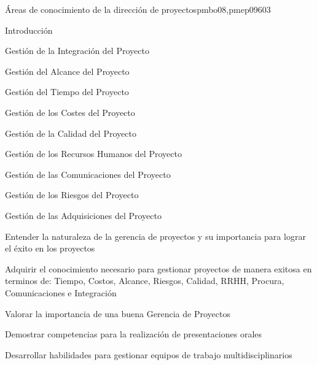 \begin{syllabus}
\begin{unit}{Áreas de conocimiento de la dirección de proyectos}{pmbo08,pmep09}{60}{3}
\begin{topics}
      \item Introducción
      \item Gestión de la Integración del Proyecto
      \item Gestión del Alcance del Proyecto
      \item Gestión del Tiempo del Proyecto
      \item Gestión de los Costes del Proyecto
      \item Gestión de la Calidad del Proyecto
      \item Gestión de los Recursos Humanos del Proyecto
      \item Gestión de las Comunicaciones del Proyecto
      \item Gestión de los Riesgos del Proyecto
      \item Gestión de las Adquisiciones del Proyecto
   \end{topics}

   \begin{unitgoals}
      \item Entender la naturaleza de la gerencia de proyectos y su importancia para lograr el éxito en los proyectos
      \item Adquirir el conocimiento necesario para gestionar proyectos de manera exitosa en terminos de: Tiempo, Costos, Alcance, Riesgos, Calidad, RRHH, Procura, Comunicaciones e Integración
       \item Valorar la importancia de una buena Gerencia de Proyectos
      \item Demostrar competencias para la realización de presentaciones orales
      \item Desarrollar habilidades para gestionar equipos de trabajo multidisciplinarios
   \end{unitgoals}
\end{unit}



\begin{coursebibliography}
\end{coursebibliography}

\end{syllabus}
